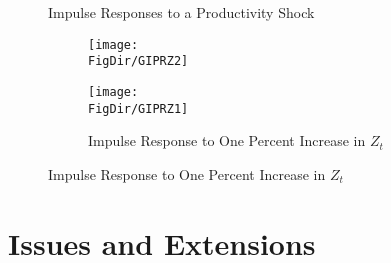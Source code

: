 \documentclass[titlepage]{\econtex}\providecommand{\texname}{BufferStockTheory}
\providecommand{\FigDir}{Figures}
\begin{document}
\begin{figure}{Impulse Responses to a Productivity Shock}
  \begin{subfigure}{}
    \centering\texttt{[image: \\FigDir/GIPRZ2]}
  \end{subfigure}
  \begin{subfigure}{}
    \centering\texttt{[image: \\FigDir/GIPRZ1]}
    \caption{ Impulse Response to One Percent Increase in $Z_{t}$}
  \end{subfigure}
\end{figure}



\hypertarget{Issues and Extensions}{}
\section{Issues and Extensions}
\end{document}
